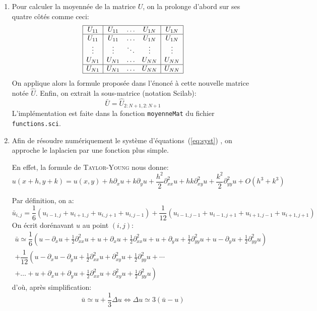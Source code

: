\begin{enumerate}[questions]
\item Pour calculer la moyennée de la matrice $U$, on la prolonge d'abord sur ses quatre \og{}côtés\fg{} comme ceci:
	\[ \begin{array}{|c|ccc|c|}
	\hline
	U_{11} & U_{11} & \dots & U_{1N} & U_{1N} \\ \hline
	U_{11} & U_{11} & \dots & U_{1N} & U_{1N} \\
	\vdots & \vdots & \ddots & \vdots & \vdots \\
	U_{N1} & U_{N1} & \dots & U_{NN} & U_{NN} \\ \hline
	U_{N1} & U_{N1} & \dots & U_{NN} & U_{NN} \\ \hline
	\end{array} \]
On applique alors la formule proposée dans l'énoncé à cette nouvelle matrice notée $\hat{U}$. Enfin, on extrait la sous-matrice (\og{}notation Scilab\fg{}):
\[ \bar{U} = \hat{U}_{2:N+1, 2:N+1} \]
L'implémentation est faite dans la fonction \verb|moyenneMat| du fichier \verb|functions.sci|.

\item Afin de résoudre numériquement le système d'équations~(\ref*{eq:syst}) , on approche le laplacien par une fonction plus simple.

En effet, la formule de \textsc{Taylor-Young} nous donne:
\[ u(x+h, y+k) = u(x,y) + h \partial_xu + k \partial_yu + \dfrac{h^2}{2}\partial^2_{xx}u + hk \partial^2_{xy}u + \dfrac{k^2}{2}\partial^2_{yy}u + O(h^3 + k^3) \]

Par définition, on a:
\[ \bar{u}_{i,j} = \dfrac{1}{6}\left( u_{i-1,j} + u_{i+1,j} + u_{i,j+1} + u_{i,j-1} \right) + \dfrac{1}{12}\left( u_{i-1,j-1} + u_{i-1,j+1} + u_{i+1,j-1} + u_{i+1,j+1} \right) \]
On écrit dorénavant $u$ au point $(i,j)$:
\begin{multline*}
\bar{u} \simeq \dfrac{1}{6} \left( u - \partial_xu + \frac{1}{2}\partial^2_{xx}u + u + \partial_xu + \frac{1}{2}\partial^2_{xx}u + u + \partial_yu + \frac{1}{2}\partial^2_{yy}u + u - \partial_yu + \frac{1}{2}\partial^2_{yy}u \right) \\
+ \dfrac{1}{12} \left( u - \partial_xu - \partial_yu + \frac{1}{2}\partial^2_{xx}u + \partial^2_{xy}u + \frac{1}{2}\partial^2_{yy}u + \cdots \right. \\
\left. + \dots + u + \partial_xu + \partial_yu + \frac{1}{2}\partial^2_{xx}u + \partial^2_{xy}u + \frac{1}{2}\partial^2_{yy}u \right)
\end{multline*}
d'où, après simplification:
\[ \bar{u} \simeq u + \dfrac{1}{3}\Delta u \iff \Delta u \simeq 3(\bar{u} - u) \]


\end{enumerate}
